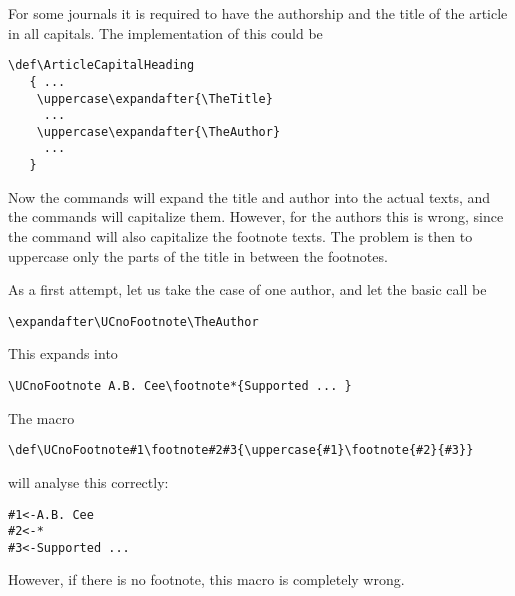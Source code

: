 \documentclass[letterpaper]{book}
\begin{document}
For some journals it is required to
have the authorship and the title of the article in all capitals.
The implementation of this could be
\begin{verbatim}
\def\ArticleCapitalHeading
   { ...
    \uppercase\expandafter{\TheTitle}
     ...
    \uppercase\expandafter{\TheAuthor}
     ...
   }
\end{verbatim}
Now the  commands will expand the title and
author into the actual texts, and the  commands
will capitalize them. However, for the authors this is wrong,
since the  command will also capitalize the
footnote texts.
The problem is then to uppercase only the parts
of the title in between the footnotes.

As a first attempt, let us take the case of one author, and
let the basic call be
\begin{verbatim}
\expandafter\UCnoFootnote\TheAuthor
\end{verbatim}
This expands into
\begin{verbatim}
\UCnoFootnote A.B. Cee\footnote*{Supported ... }
\end{verbatim}
The macro
\begin{verbatim}
\def\UCnoFootnote#1\footnote#2#3{\uppercase{#1}\footnote{#2}{#3}}
\end{verbatim}
will analyse this correctly:
\begin{verbatim}
#1<-A.B. Cee
#2<-*
#3<-Supported ...
\end{verbatim}
However, if there is no footnote, this macro is completely wrong.
\end{document}
